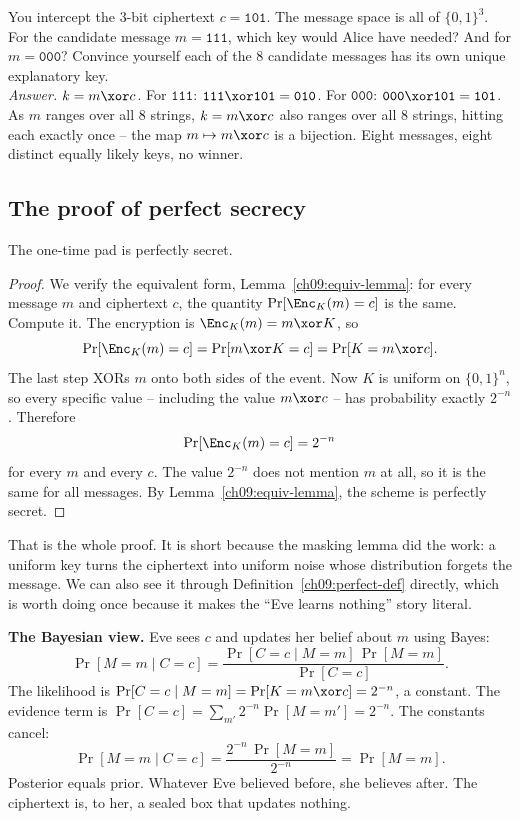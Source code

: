 \begin{walkbox}
You intercept the 3-bit ciphertext $c = \texttt{101}$. The message space is all of $\{0,1\}^3$. For the candidate message $m = \texttt{111}$, which key would Alice have needed? And for $m = \texttt{000}$? Convince yourself each of the $8$ candidate messages has its own unique explanatory key. \\[2pt]
\emph{Answer.} $k = m \xor c$. For $\texttt{111}$: $\texttt{111}\xor\texttt{101} = \texttt{010}$. For $\texttt{000}$: $\texttt{000}\xor\texttt{101}=\texttt{101}$. As $m$ ranges over all $8$ strings, $k = m \xor c$ also ranges over all $8$ strings, hitting each exactly once -- the map $m \mapsto m\xor c$ is a bijection. Eight messages, eight distinct equally likely keys, no winner.
\end{walkbox}

\subsection{The proof of perfect secrecy}
\label{ch09:otp-proof}

\begin{theorem}[Shannon, 1949]
\label{ch09:otp-secure}
The one-time pad is perfectly secret.
\end{theorem}

\begin{proof}
We verify the equivalent form, Lemma~\ref{ch09:equiv-lemma}: for every message $m$ and ciphertext $c$, the quantity $\Pr[\Enc_K(m) = c]$ is the same. Compute it. The encryption is $\Enc_K(m) = m \xor K$, so
\[
  \Pr[\Enc_K(m) = c] = \Pr[m \xor K = c] = \Pr[K = m \xor c].
\]
The last step XORs $m$ onto both sides of the event. Now $K$ is uniform on $\{0,1\}^n$, so every specific value -- including the value $m \xor c$ -- has probability exactly $2^{-n}$. Therefore
\[
  \Pr[\Enc_K(m) = c] = 2^{-n}
\]
for every $m$ and every $c$. The value $2^{-n}$ does not mention $m$ at all, so it is the same for all messages. By Lemma~\ref{ch09:equiv-lemma}, the scheme is perfectly secret.
\end{proof}

That is the whole proof. It is short because the masking lemma did the work: a uniform key turns the ciphertext into uniform noise whose distribution forgets the message. We can also see it through Definition~\ref{ch09:perfect-def} directly, which is worth doing once because it makes the ``Eve learns nothing'' story literal.

\begin{whybox}
\textbf{The Bayesian view.} Eve sees $c$ and updates her belief about $m$ using Bayes:
\[
  \Pr[M = m \mid C = c] = \frac{\Pr[C=c \mid M=m]\,\Pr[M=m]}{\Pr[C=c]}.
\]
The likelihood is $\Pr[C=c\mid M=m] = \Pr[K = m\xor c] = 2^{-n}$, a constant. The evidence term is $\Pr[C=c] = \sum_{m'} 2^{-n}\Pr[M=m'] = 2^{-n}$. The constants cancel:
\[
  \Pr[M=m\mid C=c] = \frac{2^{-n}\,\Pr[M=m]}{2^{-n}} = \Pr[M=m].
\]
Posterior equals prior. Whatever Eve believed before, she believes after. The ciphertext is, to her, a sealed box that updates nothing.
\end{whybox}

